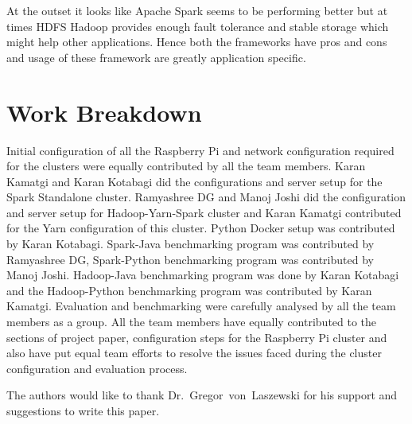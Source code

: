  At the outset it looks like Apache Spark seems to be performing better but at 
 times HDFS Hadoop provides enough fault tolerance and stable storage which 
 might help other applications. Hence both the frameworks have pros and cons and
 usage of these framework are greatly application specific. 


% 


\section{Work Breakdown}

Initial configuration of all the Raspberry Pi and network configuration 
required for the clusters were equally contributed by all the team members.
Karan Kamatgi and Karan Kotabagi did the configurations and server setup for the
Spark Standalone cluster. Ramyashree DG and Manoj Joshi did the configuration 
and server setup for Hadoop-Yarn-Spark cluster and Karan Kamatgi contributed for
the Yarn configuration of this cluster. Python Docker setup was contributed by 
Karan Kotabagi. Spark-Java benchmarking program was contributed by Ramyashree DG,
Spark-Python benchmarking program was contributed by Manoj Joshi. Hadoop-Java 
benchmarking program was done by Karan Kotabagi and the Hadoop-Python 
benchmarking program was contributed by Karan Kamatgi. Evaluation and 
benchmarking were carefully analysed by all the team members as a group. All the 
team members have equally contributed to the sections of project paper, 
configuration steps for the Raspberry Pi cluster and also have put equal team 
efforts to resolve the issues faced during the cluster configuration and 
evaluation process.







\begin{acks}

  The authors would like to thank Dr.~Gregor~von~Laszewski 
  for his support and suggestions to write this paper.
  
\end{acks}


